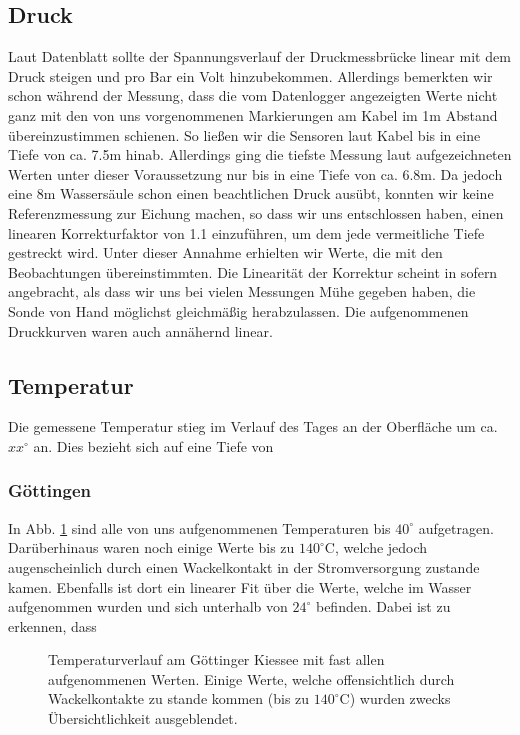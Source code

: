 \documentclass[12pt,a4paper,titlepage,headinclude,bibtotoc]{scrartcl}
\begin{document}
\subsection{Druck}
Laut Datenblatt sollte der Spannungsverlauf der Druckmessbrücke linear mit dem Druck steigen und pro Bar ein Volt hinzubekommen.
Allerdings bemerkten wir schon während der Messung, dass die vom Datenlogger angezeigten Werte nicht ganz mit den von uns vorgenommenen Markierungen am Kabel im 1m Abstand übereinzustimmen schienen.
So ließen wir die Sensoren laut Kabel bis in eine Tiefe von ca. 7.5m hinab.
Allerdings ging die tiefste Messung laut aufgezeichneten Werten unter dieser Voraussetzung nur bis in eine Tiefe von ca. 6.8m.
Da jedoch eine 8m Wassersäule schon einen beachtlichen Druck ausübt, konnten wir keine Referenzmessung zur Eichung machen, so dass wir uns entschlossen haben, einen linearen Korrekturfaktor von 1.1 einzuführen, um dem jede vermeitliche Tiefe gestreckt wird.
Unter dieser Annahme erhielten wir Werte, die mit den Beobachtungen übereinstimmten.
Die Linearität der Korrektur scheint in sofern angebracht, als dass wir uns bei vielen Messungen Mühe gegeben haben, die Sonde von Hand möglichst gleichmäßig herabzulassen.
Die aufgenommenen Druckkurven waren auch annähernd linear.


\subsection{Temperatur}
Die gemessene Temperatur stieg im Verlauf des Tages an der Oberfläche um ca. $xx^\circ$ an.
Dies bezieht sich auf eine Tiefe von  

\subsubsection{Göttingen}
In Abb. \ref{fig:temp_goe} sind alle von uns aufgenommenen Temperaturen bis $40^\circ$ aufgetragen.
Darüberhinaus waren noch einige Werte bis zu $140^\circ$C, welche jedoch augenscheinlich durch einen Wackelkontakt in der Stromversorgung zustande kamen.
Ebenfalls ist dort ein linearer Fit über die Werte, welche im Wasser aufgenommen wurden und sich unterhalb von $24^\circ$ befinden.
Dabei ist zu erkennen, dass

\begin{figure}[h]
\centering

\caption{Temperaturverlauf am Göttinger Kiessee mit fast allen aufgenommenen Werten. Einige Werte, welche offensichtlich durch Wackelkontakte zu stande kommen (bis zu $140^\circ$C) wurden zwecks Übersichtlichkeit ausgeblendet.}
\label{fig:temp_goe}
\end{figure}
\end{document}

